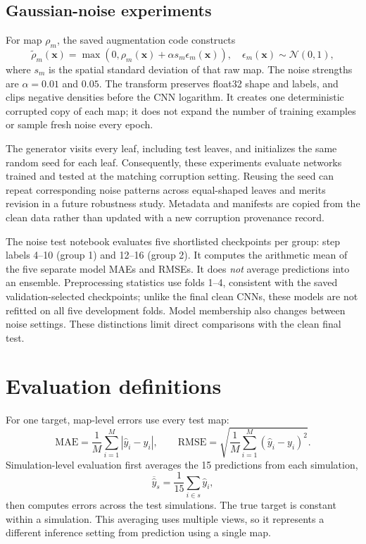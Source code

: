\documentclass[11pt,a4paper]{article}
\begin{document}
\subsection{Gaussian-noise experiments}
For map $\rho_m$, the saved augmentation code constructs
\begin{equation}
\widetilde\rho_m(\mathbf{x})=
\max\!\left(0,\rho_m(\mathbf{x})+\alpha s_m\epsilon_m(\mathbf{x})\right),
\quad \epsilon_m(\mathbf{x})\sim\mathcal N(0,1),
\end{equation}
where $s_m$ is the spatial standard deviation of that raw map. The noise strengths are $\alpha=0.01$ and $0.05$. The transform preserves float32 shape and labels, and clips negative densities before the CNN logarithm. It creates one deterministic corrupted copy of each map; it does not expand the number of training examples or sample fresh noise every epoch.

The generator visits every  leaf, including test leaves, and initializes the same random seed for each leaf. Consequently, these experiments evaluate networks trained and tested at the matching corruption setting. Reusing the seed can repeat corresponding noise patterns across equal-shaped leaves and merits revision in a future robustness study. Metadata and manifests are copied from the clean data rather than updated with a new corruption provenance record.

The noise test notebook evaluates five shortlisted checkpoints per group: step labels 4--10 (group 1) and 12--16 (group 2). It computes the arithmetic mean of the five separate model MAEs and RMSEs. It does \emph{not} average predictions into an ensemble. Preprocessing statistics use folds 1--4, consistent with the saved validation-selected checkpoints; unlike the final clean CNNs, these models are not refitted on all five development folds. Model membership also changes between noise settings. These distinctions limit direct comparisons with the clean final test.

\section{Evaluation definitions}
For one target, map-level errors use every test map:
\begin{equation}
\mathrm{MAE}=\frac1M\sum_{i=1}^M|\hat y_i-y_i|,
\qquad
\mathrm{RMSE}=\sqrt{\frac1M\sum_{i=1}^M(\hat y_i-y_i)^2}.
\end{equation}
Simulation-level evaluation first averages the 15 predictions from each simulation,
\begin{equation}
\overline{\hat y}_s=\frac1{15}\sum_{i\in s}\hat y_i,
\end{equation}
then computes errors across the test simulations. The true target is constant within a simulation. This averaging uses multiple views, so it represents a different inference setting from prediction using a single map.
\end{document}
